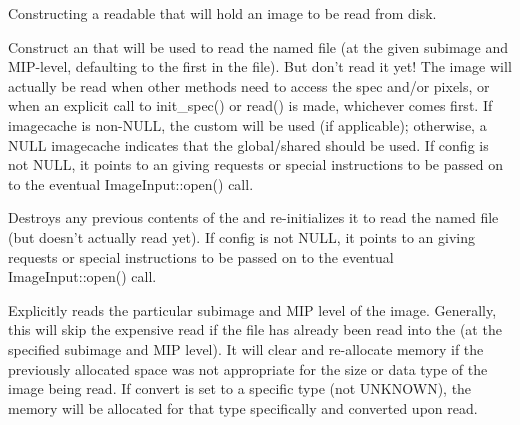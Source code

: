 Constructing a readable \ImageBuf that will hold an image to be read
from disk.

Construct an \ImageBuf that will be used to read the named file (at the
given subimage and MIP-level, defaulting to the first in the file).  But
don't read it yet!  The image will actually be read when other methods
need to access the spec and/or pixels, or when an explicit call to
{\cf init_spec()} or {\cf read()} is made, whichever comes first. 
If {\cf imagecache} is non-NULL, the custom
\ImageCache will be used (if applicable); otherwise, a NULL imagecache
indicates that the global/shared \ImageCache should be used.
If {\cf config} is not NULL, it points to an \ImageSpec giving requests
or special instructions to be passed on to the eventual
{\cf ImageInput::open()} call.
\apiend

Destroys any previous contents of the \ImageBuf and re-initializes it
to read the named file (but doesn't actually read yet).
If {\cf config} is not NULL, it points to an \ImageSpec giving requests
or special instructions to be passed on to the eventual
{\cf ImageInput::open()} call.
\apiend


Explicitly reads the particular subimage and MIP level of the image.  Generally,
this will skip the expensive read if the file has already been read into
the \ImageBuf (at the specified subimage and MIP level).  It will clear
and re-allocate memory if the previously allocated space was not
appropriate for the size or data type of the image being read.
If {\cf convert} is set to a specific type (not {\cf UNKNOWN}), the
\ImageBuf memory will be allocated for that type specifically and
converted upon read.

